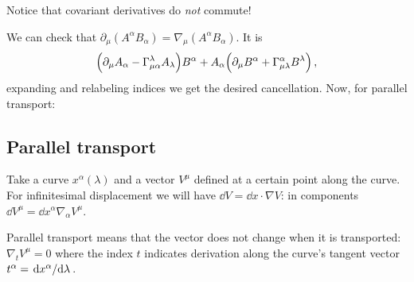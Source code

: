 \documentclass[main.tex]{subfiles}
\begin{document}
Notice that covariant derivatives do \emph{not} commute!

We can check that \(\partial_{\mu} (A^{\alpha }B_{\alpha }) = \nabla_{\mu } (A^{\alpha }B_{\alpha })\). It is 
%
\begin{equation}
  \qty(\partial_{\mu }A_{\alpha } - \Gamma^{\lambda }_{\mu \alpha }A_{\lambda })B^{\alpha } 
  + A_{\alpha }\qty(\partial_{\mu }B^{\alpha } + \Gamma_{\mu \lambda }^{ \alpha }B^{\lambda })
\,,
\end{equation}
%
expanding and relabeling indices we get the desired cancellation. Now, for parallel transport:

\subsection{Parallel transport}

Take a curve \(x^{\alpha }(\lambda )\) and a vector \(V^{\mu }\) defined at a certain point along the curve.
For infinitesimal displacement we will have \(\dd{V} = \dd{x} \cdot \nabla V\): in components \(\dd{V^{\mu }} = \dd{x^{\alpha }} \nabla_{\alpha }V^{\mu }\).

Parallel transport means that the vector does not change when it is transported: \(\nabla_t V^{\mu }=0\) where the index \(t \) indicates derivation along the curve's tangent vector \(t^{\alpha }= \dv*{x^{\alpha }}{\lambda } \). 
\end{document}
